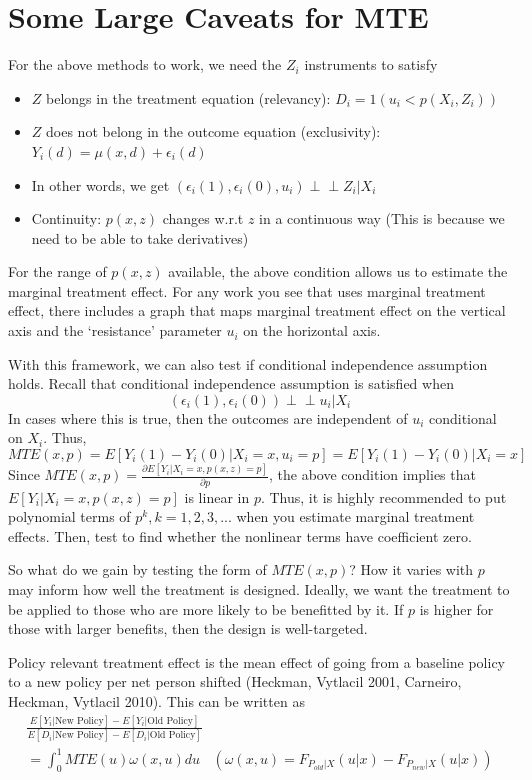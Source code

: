 \section{Some Large Caveats for MTE}
For the above methods to work, we need the $Z_i$ instruments to satisfy
\begin{itemize}
\item $Z$ belongs in the treatment equation (relevancy): $D_i=1(u_i<p(X_i,Z_i))$
\item $Z$ does not belong in the outcome equation (exclusivity): $Y_i(d)=\mu(x,d)+\epsilon_i(d)$
\item In other words, we get $(\epsilon_i(1), \epsilon_i(0), u_i) \perp\!\!\!\perp Z_i|X_i$
\item Continuity: $p(x,z)$ changes w.r.t $z$ in a continuous way (This is because we need to be able to take derivatives)
\end{itemize}
For the range of $p(x,z)$ available, the above condition allows us to estimate the marginal treatment effect. For any work you see that uses marginal treatment effect, there includes a graph that maps marginal treatment effect on the vertical axis and the `resistance' parameter $u_i$ on the horizontal axis. \par
With this framework, we can also test if conditional independence assumption holds. Recall that conditional independence assumption is satisfied when
\[
(\epsilon_i(1),\epsilon_i(0)) \perp\!\!\!\perp u_i|X_i
\]
In cases where this is true, then the outcomes are independent of $u_i$ conditional on $X_i$. Thus, 
\[
MTE(x,p)=E[Y_i(1)-Y_i(0)|X_i=x, u_i=p]=E[Y_i(1)-Y_i(0)|X_i=x]
\]
Since $MTE(x,p)=\frac{\partial E[Y_i | X_i=x, p(x, z)=p]}{\partial p}$, the above condition implies that $E[Y_i|X_i=x, p(x, z)=p]$ is linear in $p$. Thus, it is highly recommended to put polynomial terms of $p^k, k=1,2,3,...$ when you estimate marginal treatment effects. Then, test to find whether the nonlinear terms have coefficient zero. 
\par 
So what do we gain by testing the form of $MTE(x,p)$? How it varies with $p$ may inform how well the treatment is designed. Ideally, we want the treatment to be applied to those who are more likely to be benefitted by it. If $p$ is higher for those with larger benefits, then the design is well-targeted.
\begin{mdframed}[backgroundcolor=blue!5] 
\begin{definition}  Policy relevant treatment effect is the mean effect of going from a baseline policy to a new policy per net person shifted (Heckman, Vytlacil 2001, Carneiro, Heckman, Vytlacil 2010). This can be written as
\begin{gather*}
\frac{E[Y_i|\text{New Policy}]-E[Y_i|\text{Old Policy}]}{E[D_i|\text{New Policy}]-E[D_i|\text{Old Policy}]}\\
=\int_0^1MTE(u)\omega(x,u) du\  \  \ \ (\omega(x,u)=F_{P_{old}|X}(u|x)-F_{P_{new}|X}(u|x))
\end{gather*}
\end{definition}
\end{mdframed}

